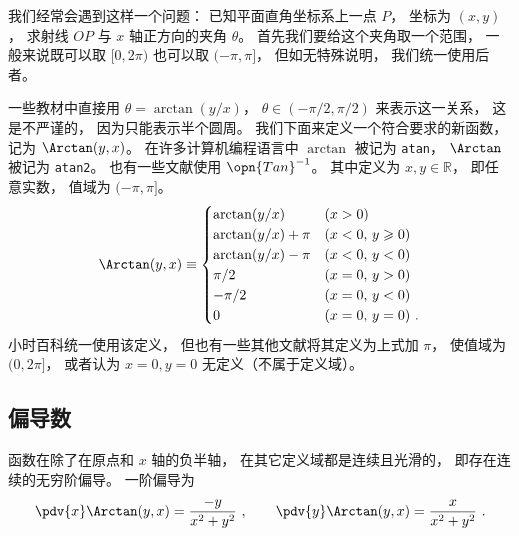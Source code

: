 

我们经常会遇到这样一个问题： 已知平面直角坐标系上一点 $P$， 坐标为 $(x, y)$， 求射线 $OP$ 与 $x$ 轴正方向的夹角 $\theta$。%
首先我们要给这个夹角取一个范围， 一般来说既可以取 $[0, 2\pi)$ 也可以取 $(-\pi, \pi]$， 但如无特殊说明， 我们统一使用后者。

一些教材中直接用 $\theta = \arctan(y/x)$， $\theta \in (-\pi/2, \pi/2)$ 来表示这一关系， 这是不严谨的， 因为只能表示半个圆周。 我们下面来定义一个符合要求的新函数， 记为 $\Arctan(y, x)$。 在许多计算机编程语言中 $\arctan$ 被记为 \lstinline|atan|， $\Arctan$ 被记为 \lstinline|atan2|。 也有一些文献使用 $\opn{Tan}^{-1}$。 其中定义为 $x, y \in \mathbb R$， 即任意实数， 值域为 $(-\pi, \pi]$。
\begin{equation}\label{eq_Arctan_1}
\Arctan(y,x) \equiv 
\begin{cases}
\arctan (y/x) \quad &(x > 0)\\
\arctan (y/x) + \pi  &(x < 0,\,y \geqslant 0)\\
\arctan (y/x) - \pi  &(x < 0,\,y < 0)\\
\pi /2  &(x = 0, \,y > 0)\\
 -\pi /2  &(x = 0, \,y < 0)\\
0 & (x=0,\,y=0)~.
\end{cases}
\end{equation}
小时百科统一使用该定义， 但也有一些其他文献将其定义为上式加 $\pi$， 使值域为 $(0, 2\pi]$， 或者认为 $x = 0, y = 0$ 无定义（不属于定义域）。

\subsection{偏导数}
函数在除了在原点和 $x$ 轴的负半轴， 在其它定义域都是连续且光滑的， 即存在连续的无穷阶偏导。 一阶偏导为
\begin{equation}
\pdv{x} \Arctan(y, x) = \frac{-y}{x^2 + y^2} ~,\qquad
\pdv{y} \Arctan(y, x) = \frac{x}{x^2 + y^2}~.
\end{equation}
